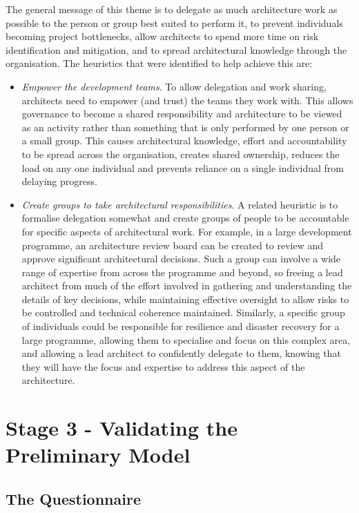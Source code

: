 The general message of this theme is to delegate as much architecture work as possible to the person or group best suited to perform it, to prevent individuals becoming project bottlenecks, allow architects to spend more time on risk identification and mitigation, and to spread architectural knowledge through the organisation.  The heuristics that were identified to help achieve this are:

\begin{itemize}
	\item \emph{Empower the development teams}. To allow delegation and work sharing, architects need to empower (and trust) the teams they work with.  This allows governance to become a shared responsibility and architecture to be viewed as an activity rather than something that is only performed by one person or a small group.  This causes architectural knowledge, effort and accountability to be spread across the organisation, creates shared ownership, reduces the load on any one individual and prevents reliance on a single individual from delaying progress.
	\item \emph{Create groups to take architectural responsibilities}.  A related heuristic is to formalise delegation somewhat and create groups of people to be accountable for specific aspects of architectural work.  For example, in a large development programme, an architecture review board can be created to review and approve significant architectural decisions.  Such a group can involve a wide range of expertise from across the programme and beyond, so freeing a lead architect from much of the effort involved in gathering and understanding the details of key decisions, while maintaining effective oversight to allow risks to be controlled and technical coherence maintained.  Similarly, a specific group of individuals could be responsible for resilience and disaster recovery for a large programme, allowing them to specialise and focus on this complex area, and allowing a lead architect to confidently delegate to them, knowing that they will have the focus and expertise to address this aspect of the architecture.
\end{itemize}

\section{Stage 3 - Validating the Preliminary Model}

\subsection{The Questionnaire}

